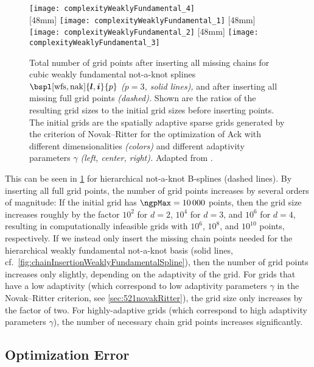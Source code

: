 \begin{figure}
  \texttt{[image: complexityWeaklyFundamental\_4]}\\[2mm]%
  [48mm]{%
    \texttt{[image: complexityWeaklyFundamental\_1]}%
  }%
  \hfill%
  [48mm]{%
    \texttt{[image: complexityWeaklyFundamental\_2]}%
  }%
  \hfill%
  [48mm]{%
    \texttt{[image: complexityWeaklyFundamental\_3]}%
  }%
  \caption[Complexity of weakly fundamental splines]{%
    Total number of grid points after inserting all missing chains
    for cubic weakly fundamental not-a-knot splines
    $\bspl[\wfs,\nak]{\*l,\*i}{p}$ \emph{($p = 3$, solid lines),}
    and after inserting all missing full grid points \emph{(dashed).}
    Shown are the ratios of the resulting grid sizes to the
    initial grid sizes before inserting points.
    The initial grids are the spatially adaptive sparse grids generated
    by the criterion of Novak--Ritter for the optimization of Ack with
    different dimensionalities \emph{(colors)} and
    different adaptivity parameters $\gamma$ \emph{(left, center, right).}
    Adapted from \cite{Valentin18Fundamental}.%
  }%
  \label{fig:complexityWeaklyFundamental}%
\end{figure}

This can be seen in \cref{fig:complexityWeaklyFundamental}
for hierarchical not-a-knot B-splines (dashed lines).
By inserting all full grid points,
the number of grid points increases by several orders of magnitude:
If the initial grid has $\ngpMax = \num{10000}$ points,
then the grid size increases roughly by the factor $10^2$ for $d = 2$,
$10^4$ for $d = 3$, and $10^6$ for $d = 4$,
resulting in computationally infeasible
grids with $10^6$, $10^8$, and $10^{10}$ points, respectively.
If we instead only insert the missing chain points needed for the
hierarchical weakly fundamental not-a-knot basis
(solid lines, cf.\ \cref{fig:chainInsertionWeaklyFundamentalSpline}),
then the number of grid points increases only slightly,
depending on the adaptivity of the grid.
For grids that have a low adaptivity (which correspond
to low adaptivity parameters $\gamma$ in the Novak--Ritter criterion,
see \cref{sec:521novakRitter}), the grid size only increases by the
factor of two.
For highly-adaptive grids
(which correspond to high adaptivity parameters $\gamma$),
the number of necessary chain grid points increases significantly.



\subsection{Optimization Error}
\label{sec:542optimization}


